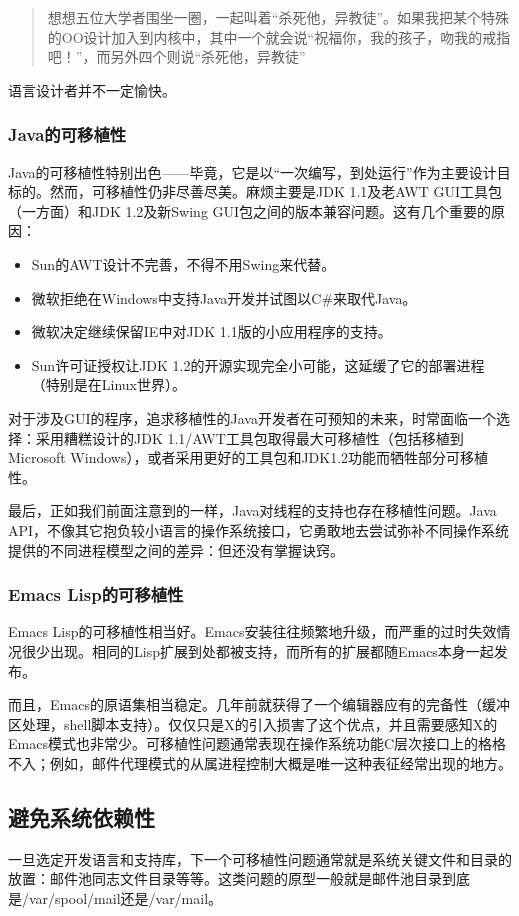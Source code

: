 \documentclass[12pt,oneside]{book}
\begin{document}
\begin{quote}
想想五位大学者围坐一圈，一起叫着“杀死他，异教徒”。如果我把某个特殊的OO设计加入到内核中，其中一个就会说“祝福你，我的孩子，吻我的戒指吧！”，而另外四个则说“杀死他，异教徒”
\end{quote}

语言设计者并不一定愉快。

\subsubsection{Java的可移植性}
Java的可移植性特别出色——毕竟，它是以“一次编写，到处运行”作为主要设计目标的。然而，可移植性仍非尽善尽美。麻烦主要是JDK 1.1及老AWT GUI工具包（一方面）和JDK 1.2及新Swing GUI包之间的版本兼容问题。这有几个重要的原因：
\begin{itemize}
\item Sun的AWT设计不完善，不得不用Swing来代替。
\item 微软拒绝在Windows中支持Java开发并试图以C\#{}来取代Java。
\item 微软决定继续保留IE中对JDK 1.1版的小应用程序的支持。
\item Sun许可证授权让JDK 1.2的开源实现完全小可能，这延缓了它的部署进程（特别是在Linux世界）。
\end{itemize}

对于涉及GUI的程序，追求移植性的Java开发者在可预知的未来，时常面临一个选择：采用糟糕设计的JDK 1.1/AWT工具包取得最大可移植性（包括移植到Microsoft Windows），或者采用更好的工具包和JDK1.2功能而牺牲部分可移植性。

最后，正如我们前面注意到的一样，Java对线程的支持也存在移植性问题。Java API，不像其它抱负较小语言的操作系统接口，它勇敢地去尝试弥补不同操作系统提供的不同进程模型之间的差异：但还没有掌握诀窍。

\subsubsection{Emacs Lisp的可移植性}
Emacs Lisp的可移植性相当好。Emacs安装往往频繁地升级，而严重的过时失效情况很少出现。相同的Lisp扩展到处都被支持，而所有的扩展都随Emacs本身一起发布。

而且，Emacs的原语集相当稳定。几年前就获得了一个编辑器应有的完备性（缓冲区处理，shell脚本支持）。仅仅只是X的引入损害了这个优点，并且需要感知X的Emacs模式也非常少。可移植性问题通常表现在操作系统功能C层次接口上的格格不入；例如，邮件代理模式的从属进程控制大概是唯一这种表征经常出现的地方。

\subsection{避免系统依赖性}
一旦选定开发语言和支持库，下一个可移植性问题通常就是系统关键文件和目录的放置：邮件池同志文件目录等等。这类问题的原型一般就是邮件池目录到底是/var/spool/mail还是/var/mail。
\end{document}

